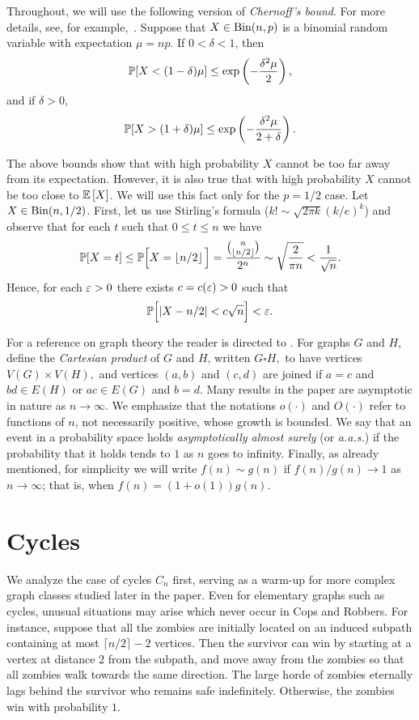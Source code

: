 \documentclass[12pt]{amsart}
\begin{document}
\bigskip

Throughout, we will use the following version of \emph{Chernoff's bound}. For more details, see, for example,~\cite{JLR}. Suppose that $X \in \mathrm{Bin}(n,p)$ is a binomial random variable with expectation
$\mu=np$. If $0<\delta<1$, then
$$
\mathbb{P} [X < (1-\delta)\mu] \le \exp \left( -\frac{\delta^2 \mu}{2} \right),
$$
and if $\delta > 0$,
\[\mathbb{P} [ X > (1+\delta)\mu] \le \exp\left(-\frac{\delta^2 \mu}{2+\delta}\right).\]

The above bounds show that with high probability $X$ cannot be too far away from its expectation. However, it is also true that with high probability $X$ cannot be too close to $\mathbb{E}\left[X \right]$. We will use this fact only for the $p=1/2$ case. Let $X \in \mathrm{Bin}(n,1/2)$. First, let us use Stirling's formula ($k! \sim \sqrt{2\pi k} (k/e)^k$) and observe that for each $t$ such that $0 \le t \le n$ we have
$$
\mathbb{P} [ X = t] \le \mathbb{P} \Big[ X = \left \lfloor n/2 \right \rfloor \Big] = \frac {{ n \choose \lfloor n/2 \rfloor }} {2^n} \sim \sqrt{\frac {2}{\pi n} } < \frac {1}{\sqrt{n}}.
$$
Hence, for each $\varepsilon>0$ there exists $c = c(\varepsilon) > 0$ such that
\begin{equation}\label{eq:Bin_lower}
\mathbb{P} \Big[ |X - n/2| < c \sqrt{n} \Big] < \varepsilon.
\end{equation}

\bigskip

For a reference on graph theory the reader is directed to \cite{west}. For graphs $G$ and $H$, define the \emph{Cartesian product} of $G$ and $H$, written $G\square H,$ to have vertices $V(G)\times
V(H),$ and vertices $(a,b)$ and $(c,d)$ are joined if $a=c$ and $bd \in E(H)$ or $ac \in E(G)$ and $b=d.$ Many results in the paper are asymptotic in nature as $n \rightarrow \infty$. We emphasize that the notations $o(\cdot)$ and $O(\cdot)$ refer to functions of $n$, not necessarily positive, whose growth is bounded. We say that an event in a probability space holds
\emph{asymptotically almost surely} (or \emph{a.a.s.}) if the probability that it holds tends to $1$ as $n$ goes to infinity. Finally, as already mentioned, for simplicity we will write $f(n) \sim g(n)$ if $f(n)/g(n) \to
1$ as $n \to \infty$; that is, when $f(n) = (1+o(1)) g(n)$.

\section{Cycles}\label{seccycle}
We analyze the case of cycles $C_n$ first, serving as a warm-up for more complex graph classes studied later in the paper.
Even for elementary graphs such as cycles, unusual situations may arise which never occur in Cops and Robbers. For instance, suppose that all the zombies are initially located on an induced subpath
containing at most $\lceil n/2 \rceil -2$ vertices.  Then the survivor can win by starting at a vertex at distance 2 from the subpath, and move away from the zombies so that all zombies walk towards the same direction.
The large horde of zombies eternally lags behind the survivor who remains safe indefinitely. Otherwise, the zombies win with probability $1$. 
\end{document}
